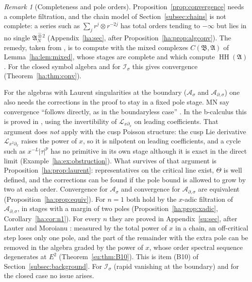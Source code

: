 \documentclass[11pt,oneside,reqno]{article}
\DeclareMathOperator{\HH}{HH}
\newcommand{\Is}{\mathcal I_\sigma}
\newcommand{\As}{\mathcal A_\sigma}
\newcommand{\Ads}{\mathcal A_{\partial,\sigma}}
\theoremstyle{plain}
\theoremstyle{definition}
\theoremstyle{remark}
\newtheorem{remark}[theorem]{Remark}
\begin{document}
\begin{remark}[Completeness and pole orders]\label{rem:poles}
Proposition~\ref{prop:convergence} needs a complete filtration, and the
chain model of Section~\ref{subsec:chains} is not complete: a series such
as \(\sum_jr^j\otimes r^{-2j}\) has total orders tending to \(-\infty\)
but lies in no single \(\mathfrak A_N^{\widehat\otimes2}\)
(Appendix~\ref{ha:sec}, after Proposition~\ref{ha:prop:algconv}). The
remedy, taken from \cite[\S``Convergence and degeneration'']{HHb}, is to
compute with the mixed complexes \(C(\mathfrak B,\mathfrak A)\) of
Lemma~\ref{ha:lem:mixed}, whose stages are complete and which compute
\(\HH(\mathfrak A)\). For the closed symbol algebra and for \(\Is\) this
gives convergence (Theorem~\ref{ha:thm:conv}).

For the algebras with Laurent singularities at the boundary (\(\As\) and
\(\Ads\)) one also needs the corrections in the proof to stay in a fixed
pole stage. MN say convergence ``follows directly, as in the boundaryless
case'' \cite[p.~12]{MN}. In the b-calculus this is proved in
\cite[\S``Convergence and degeneration'']{HHb}, using the invertibility of
\(\mathcal L_{x\partial_x}\) on leading coefficients. That argument does
\emph{not} apply with the cusp Poisson structure: the cusp Lie derivative
\(\mathcal L_{x^2\partial_x}\) raises the power of \(x\), so it is nilpotent
on leading coefficients, and a cycle such as \(x^{-L}|\tau|^p\) has no
primitive in its own stage although it is exact in the direct limit
(Example~\ref{ha:ex:obstruction}). What survives of that argument is
Proposition~\ref{ha:prop:laurent}: representatives on the critical line
exist, \(\Theta\) is well defined, and the corrections can be found if
the pole bound is allowed to grow by two at each order. Convergence for
\(\As\) and convergence for \(\Ads\) are equivalent
(Proposition~\ref{ha:prop:equiv}). For \(n=1\) both hold by the
\(x\)-adic filtration of \(\Ads\), in stages with a margin of two poles
(Proposition~\ref{ha:prop:xadic}, Corollary~\ref{ha:cor:n1}). For every
\(n\) they are proved in Appendix~\ref{su:sec}, after Lauter and
Moroianu \cite{LauterMoroianu}: measured by the total power of \(x\) in a
chain, an off-critical step loses only one pole, and the part of the
remainder with the extra pole can be removed in the algebra graded by
the power of \(x\), whose order spectral sequence degenerates at
\(E^2\) (Theorem~\ref{su:thm:B10}). This is item (B10) of
Section~\ref{subsec:background}. For \(\Is\) (rapid vanishing at the
boundary) and for the closed case no issue arises.
\end{remark}
\end{document}
